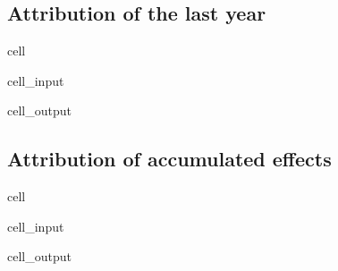 \documentclass[letterpaper,10pt,english]{jupyterBook}
\begin{document}
\subsection{Attribution of the last year}
\label{\detokenize{content/06_ModelAnalytics/Attribution:attribution-of-the-last-year}}
\begin{sphinxuseclass}{cell}\begin{sphinxVerbatimInput}

\begin{sphinxuseclass}{cell_input}
\begin{sphinxVerbatim}[commandchars=\\\{\}]
\end{sphinxVerbatim}

\end{sphinxuseclass}\end{sphinxVerbatimInput}
\begin{sphinxVerbatimOutput}

\begin{sphinxuseclass}{cell_output}
\noindent{}

\end{sphinxuseclass}\end{sphinxVerbatimOutput}

\end{sphinxuseclass}

\subsection{Attribution of accumulated effects}
\label{\detokenize{content/06_ModelAnalytics/Attribution:attribution-of-accumulated-effects}}
\begin{sphinxuseclass}{cell}\begin{sphinxVerbatimInput}

\begin{sphinxuseclass}{cell_input}
\begin{sphinxVerbatim}[commandchars=\\\{\}]
\end{sphinxVerbatim}

\end{sphinxuseclass}\end{sphinxVerbatimInput}
\begin{sphinxVerbatimOutput}

\begin{sphinxuseclass}{cell_output}
\noindent{}

\end{sphinxuseclass}\end{sphinxVerbatimOutput}

\end{sphinxuseclass}
\end{document}
